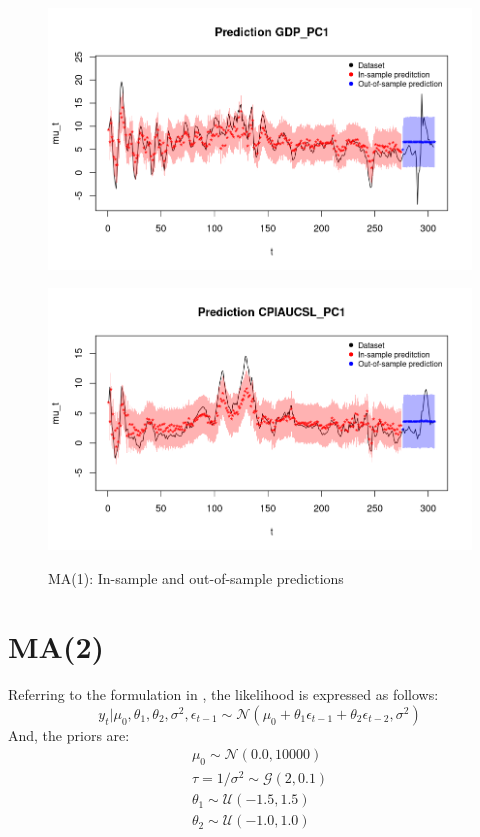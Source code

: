 \begin{figure}[h]
    \centering
    \begin{minipage}[t]{0.7\textwidth}
        \centering
        \includegraphics[width=\textwidth]{../Images/3-MA/gdp_prediction.png}
        \label{fig:MA_first}
    \end{minipage}
    \begin{minipage}[t]{0.7\textwidth}
        \centering
        \includegraphics[width=\textwidth]{../Images/3-MA/infl_prediction.png}
        \label{fig:MA_second}
    \end{minipage}
    \caption{MA(1): In-sample and out-of-sample predictions}
    \label{fig:MA_combined}
\end{figure}

\section*{MA(2)}
\label{MA(2)}
Referring to the formulation in , the likelihood is expressed as follows:
$$
y_t | \mu_0, \theta_1, \theta_2, \sigma^2, \epsilon_{t-1} \sim \mathcal{N}(\mu_0 + \theta_1 \epsilon_{t-1} + \theta_2 \epsilon_{t-2},\sigma^2)
$$
And, the priors are:
\begin{equation}
    \begin{split}
        \mu_0 \sim \mathcal{N}(0.0, 10000) \\
        \tau = 1 / \sigma^2 \sim \mathcal{G}(2, 0.1) \\
        \theta_1 \sim \mathcal{U}(-1.5, 1.5) \\
        \theta_2 \sim \mathcal{U}(-1.0, 1.0)
    \end{split}
\end{equation}

